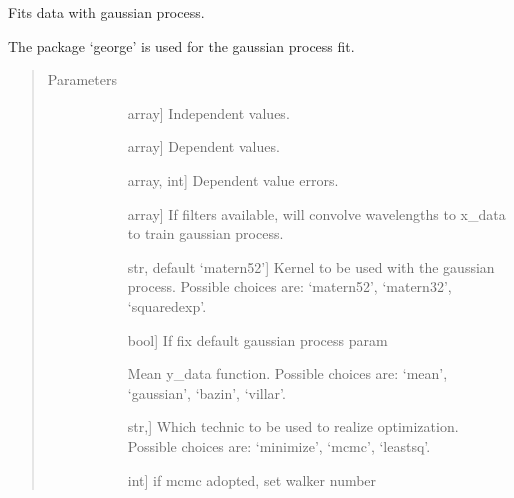 \documentclass[letterpaper,10pt,english]{sphinxmanual}
\begin{document}
\begin{fulllineitems}
\label{\detokenize{generated/sdapy.gaussian_process.fit_gp:sdapy.gaussian_process.fit_gp}}
Fits data with gaussian process.

The package ‘george’ is used for the gaussian process fit.
\begin{quote}\begin{description}
\item[{Parameters}] \leavevmode\begin{description}
\item[{}] \leavevmode{[}array{]}
Independent values.

\item[{}] \leavevmode{[}array{]}
Dependent values.

\item[{}] \leavevmode{[}array, int{]}
Dependent value errors.

\item[{}] \leavevmode{[}array{]}
If filters available, will convolve wavelengths to x\_data to train gaussian process.

\item[{}] \leavevmode{[}str, default ‘matern52’{]}
Kernel to be used with the gaussian process. 
Possible choices are: ‘matern52’, ‘matern32’, ‘squaredexp’.

\item[{}] \leavevmode{[}bool{]}
If fix default gaussian process param

\item[{}] \leavevmode
Mean y\_data function.
Possible choices are: ‘mean’, ‘gaussian’, ‘bazin’, ‘villar’.

\item[{}] \leavevmode{[}str,{]}
Which technic to be used to realize optimization.
Possible choices are: ‘minimize’, ‘mcmc’, ‘leastsq’.

\item[{}] \leavevmode{[}int{]}
if mcmc adopted, set walker number


\end{description}
\end{description}
\end{quote}
\end{fulllineitems}
\end{document}
